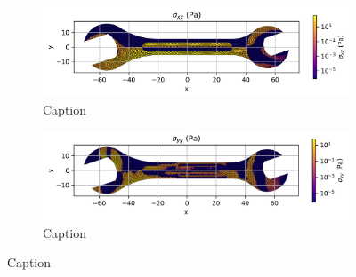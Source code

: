   \begin{figure}[H]
    \centering
    \begin{subfigure}[t]{0.49\textwidth}
      \centering
      \includegraphics[width=\textwidth]{GRAFICOS/Case b - sigma_xx_per_element.png}
      \caption{Caption}
      \label{fig:deformada_reacciones}
    \end{subfigure}
    \hfill
    \begin{subfigure}[t]{0.49\textwidth}
      \centering
      \includegraphics[width=\textwidth]{GRAFICOS/Case b - sigma_yy_per_element.png}
      \caption{Caption}
      \label{fig:von_mises}
    \end{subfigure}
    \caption{Caption}
    \label{fig:analisis_estructural}
  \end{figure}

